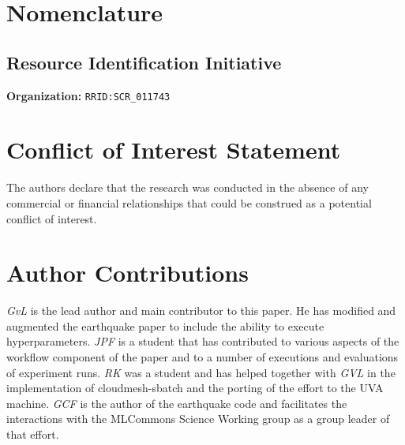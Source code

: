 \documentclass[utf8]{FrontiersinVancouver} %
\newcommand{\TODO}[1]{\todo[inline]{#1}}
\begin{document}

\clearpage

\section{Nomenclature}

\subsection{Resource Identification Initiative}

{\bf Organization:} \verb|RRID:SCR_011743|

\section*{Conflict of Interest Statement}

The authors declare that the research was conducted in the absence of
any commercial or financial relationships that could be construed as a
potential conflict of interest.

\section*{Author Contributions}

{\em GvL} is the lead author and main contributor to this paper. He
has modified and augmented the earthquake paper to include the ability
to execute hyperparameters. {\em JPF} is a student that has
contributed to various aspects of the workflow component of the paper
and to a number of executions and evaluations of experiment runs. {\em
  RK} was a student and has helped together with {\em GVL} in the
implementation of cloudmesh-sbatch and the porting of the effort to
the UVA machine.  {\em GCF} is the author of the earthquake code and
facilitates the interactions with the MLCommons Science Working group
as a group leader of that effort.
\end{document}
